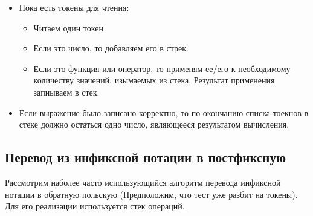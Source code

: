 \documentclass[12pt, a4paper]{article}
\begin{document}
  \begin{itemize}
    \item Пока есть токены для чтения:
      \begin{itemize}
        \item Читаем один токен
        \item Если это число, то добавляем его в стрек.
        \item Если это функция или оператор, то применям ее/его к необходимому 
          количеству значений, изымаемых из стека. Результат применения запиываем в стек.
      \end{itemize}
    \item Если выражение было записано корректно, то по окончанию списка тоекнов 
      в стеке должно остаться одно число, являющееся результатом вычисления.
  \end{itemize}

  \subsection{Перевод из инфиксной нотации в постфиксную}
  Рассмотрим наболее часто использующийся алгоритм перевода инфиксной нотации в 
  обратную польскую (Предположим, что тест уже разбит на токены). Для его реализации
  используется стек операций.
\end{document}
